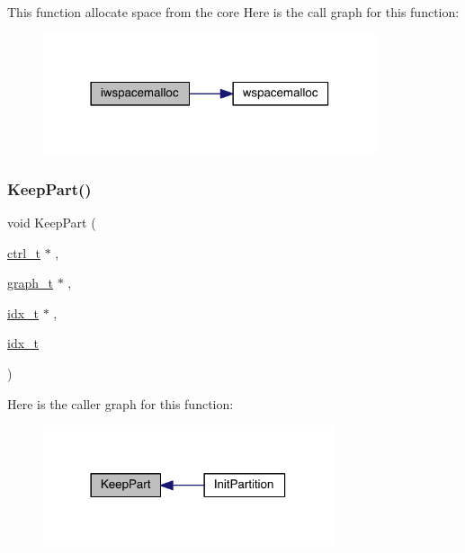 This function allocate space from the core Here is the call graph for this function\+:\nopagebreak
\begin{figure}[H]
\begin{center}
\leavevmode
\includegraphics[width=278pt]{a00951_ac838f4c6cb4f30b2888cbea0003ffc61_cgraph}
\end{center}
\end{figure}
\mbox{\label{a00951_ad169dc2b093f87f7b61a6645900e19b9}} 
\subsubsection{\texorpdfstring{Keep\+Part()}{KeepPart()}}
{\footnotesize\ttfamily void Keep\+Part (\begin{DoxyParamCaption}\item[{\hyperlink{a00742}{ctrl\+\_\+t} $\ast$}]{,  }\item[{\hyperlink{a00734}{graph\+\_\+t} $\ast$}]{,  }\item[{\hyperlink{a00876_aaa5262be3e700770163401acb0150f52}{idx\+\_\+t} $\ast$}]{,  }\item[{\hyperlink{a00876_aaa5262be3e700770163401acb0150f52}{idx\+\_\+t}}]{ }\end{DoxyParamCaption})}

Here is the caller graph for this function\+:\nopagebreak
\begin{figure}[H]
\begin{center}
\leavevmode
\includegraphics[width=242pt]{a00951_ad169dc2b093f87f7b61a6645900e19b9_icgraph}
\end{center}
\end{figure}
\mbox{\label{a00951_ad96acf60ec61cb61c4b25fe4d7cb6364}} 
